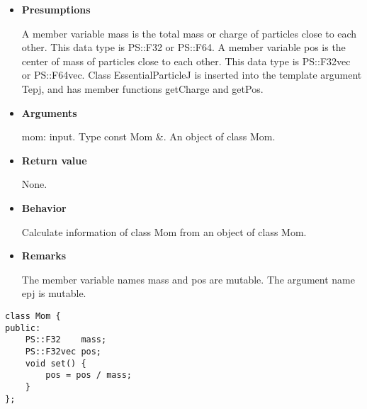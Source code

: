 \begin{itemize}

\item {\bf Presumptions}

  A member variable mass is the total mass or charge of particles
  close to each other. This data type is PS::F32 or PS::F64. A member
  variable pos is the center of mass of particles close to each
  other. This data type is PS::F32vec or PS::F64vec. Class
  EssentialParticleJ is inserted into the template argument Tepj, and
  has member functions getCharge and getPos.

\item {\bf Arguments}

  mom: input. Type const Mom \&. An object of class Mom.
  
\item {\bf Return value}

  None.

\item {\bf Behavior}

  Calculate information of class Mom from an object of class Mom.
  
\item {\bf Remarks}

  The member variable names mass and pos are mutable. The argument
  name epj is mutable.  

\end{itemize}


\begin{screen}
\begin{verbatim}
class Mom {
public:
    PS::F32    mass;
    PS::F32vec pos;
    void set() {
        pos = pos / mass;
    }
};
\end{verbatim}
\end{screen}

